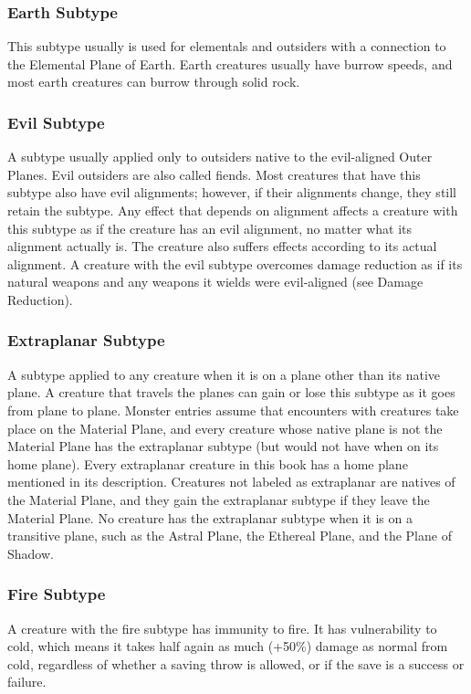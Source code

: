 \subsubsection{Earth Subtype}
This subtype usually is used for elementals and outsiders with a connection to the Elemental Plane of Earth. Earth creatures usually have burrow speeds, and most earth creatures can burrow through solid rock.

\subsubsection{Evil Subtype}
A subtype usually applied only to outsiders native to the evil-aligned Outer Planes. Evil outsiders are also called fiends. Most creatures that have this subtype also have evil alignments; however, if their alignments change, they still retain the subtype. Any effect that depends on alignment affects a creature with this subtype as if the creature has an evil alignment, no matter what its alignment actually is. The creature also suffers effects according to its actual alignment. A creature with the evil subtype overcomes damage reduction as if its natural weapons and any weapons it wields were evil-aligned (see Damage Reduction).

\subsubsection{Extraplanar Subtype}
A subtype applied to any creature when it is on a plane other than its native plane. A creature that travels the planes can gain or lose this subtype as it goes from plane to plane. Monster entries assume that encounters with creatures take place on the Material Plane, and every creature whose native plane is not the Material Plane has the extraplanar subtype (but would not have when on its home plane). Every extraplanar creature in this book has a home plane mentioned in its description. Creatures not labeled as extraplanar are natives of the Material Plane, and they gain the extraplanar subtype if they leave the Material Plane. No creature has the extraplanar subtype when it is on a transitive plane, such as the Astral Plane, the Ethereal Plane, and the Plane of Shadow.

\subsubsection{Fire Subtype}
A creature with the fire subtype has immunity to fire. It has vulnerability to cold, which means it takes half again as much (+50\%) damage as normal from cold, regardless of whether a saving throw is allowed, or if the save is a success or failure.

